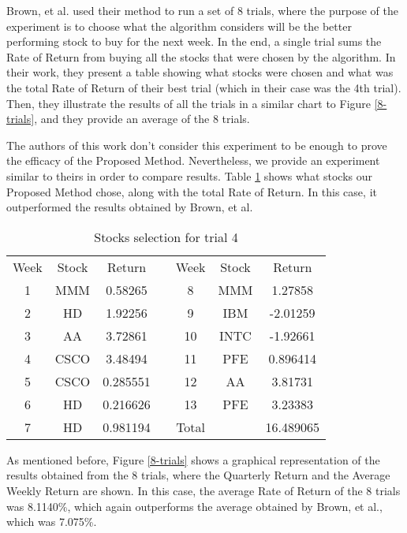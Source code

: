 Brown, et al. \cite{brown2013dynamic} used their method to run a set of 8 trials, where the purpose of the experiment is to choose what the algorithm considers will be the better performing stock to buy for the next week. In the end, a single trial sums the Rate of Return from buying all the stocks that were chosen by the algorithm. In their work, they present a table showing what stocks were chosen and what was the total Rate of Return of their best trial (which in their case was the 4th trial). Then, they illustrate the results of all the trials in a similar chart to Figure \ref{8-trials}, and they provide an average of the 8 trials.

The authors of this work don't consider this experiment to be enough to prove the efficacy of the Proposed Method. Nevertheless, we provide an experiment similar to theirs in order to compare results. Table \ref{best-trial-table} shows what stocks our Proposed Method chose, along with the total Rate of Return. In this case, it outperformed the results obtained by Brown, et al.
    
\begin{table}
    \label{best-trial-table}
    \begin{tabular}{ c c c c c c c }
        Week & Stock & Return &  & Week & Stock & Return \\ 
        1 & MMM & 0.58265 &  & 8 & MMM & 1.27858 \\ 
        2 & HD & 1.92256 &  & 9 & IBM & -2.01259 \\ 
        3 & AA & 3.72861 &  & 10 & INTC & -1.92661 \\ 
        4 & CSCO & 3.48494 &  & 11 & PFE & 0.896414 \\ 
        5 & CSCO & 0.285551 &  & 12 & AA & 3.81731 \\ 
        6 & HD & 0.216626 &  & 13 & PFE & 3.23383 \\ 
        7 & HD & 0.981194 &  & Total &  & 16.489065 \\ 
    \end{tabular} 
    \caption{Stocks selection for trial 4} 
\end{table}

As mentioned before, Figure \ref{8-trials} shows a graphical representation of the results obtained from the 8 trials, where the Quarterly Return and the Average Weekly Return are shown. In this case, the average Rate of Return of the 8 trials was 8.1140\%, which again outperforms the average obtained by Brown, et al., which was 7.075\%.

